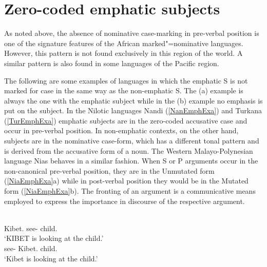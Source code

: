 
\section{Zero-coded emphatic subjects}\label{exposed}

As noted above, the absence of nominative case-marking in pre-verbal position is one of the signature features of the African marked"=nominative languages. 
However, this pattern is not found exclusively in this region of the world. A similar pattern is also found in some languages of the Pacific region. 

The following are some examples of languages in which the emphatic S is not marked for case in the same way as the non-emphatic S. 
The (a) example is always the one with the emphatic subject while in the (b) example no emphasis is put on the subject.
In the Nilotic languages Nandi (\ref{NanEmphExa}) and Turkana (\ref{TurEmphExa}) emphatic subjects are in the zero-coded accusative case and occur in pre-verbal position. 
In non-emphatic contexts, on the other hand, subjects are in the nominative case-form, which has a different tonal pattern and is derived from the accusative form of a noun.  
The Western Malayo-Polynesian language Nias behaves in a similar fashion. When S or P arguments occur in the non-canonical pre-verbal position, they  are in the Unmutated form (\ref{NiaEmphExa}a) while in post-verbal position they would be in the Mutated form (\ref{NiaEmphExa}b). 
The fronting of an argument is a communicative means employed to express the importance in discourse of the respective argument.


\begin{exe}\ex\label{NanEmphExa}
\begin{xlist}
\ex\gll {}   \\
Kibet.\acc{} \partic{} see-\ipfv{} child.\acc{}\\
\glt `{KIBET} is looking at the child.'
\ex\gll{}  \\
see-\ipfv{} Kibet.\nom{} child.\acc{}\\
\glt `Kibet is looking at the child.'
\end{xlist} 
\end{exe} 

